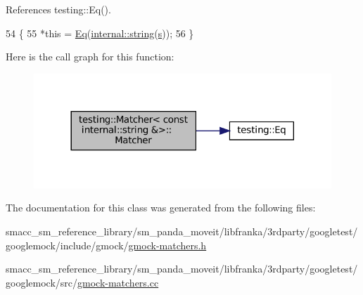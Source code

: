 References testing\+::\+Eq().


\begin{DoxyCode}
54                                                      \{
55   *\textcolor{keyword}{this} = \hyperlink{namespacetesting_a0cb8ba7eae844c871eccb29e7c81635f}{Eq}(\hyperlink{namespacetesting_1_1internal_a8e8ff5b11e64078831112677156cb111}{internal::string}(\hyperlink{namespaceservice__node__3_aa976421a49e0b54f23833423400849ae}{s}));
56 \}
\end{DoxyCode}
Here is the call graph for this function\+:
\nopagebreak
\begin{figure}[H]
\begin{center}
\leavevmode
\includegraphics[width=317pt]{classtesting_1_1Matcher_3_01const_01internal_1_1string_01_6_4_accc8b69db530a019efa2a1d6436eb3db_cgraph}
\end{center}
\end{figure}


The documentation for this class was generated from the following files\+:\begin{DoxyCompactItemize}
\item 
smacc\+\_\+sm\+\_\+reference\+\_\+library/sm\+\_\+panda\+\_\+moveit/libfranka/3rdparty/googletest/googlemock/include/gmock/\hyperlink{gmock-matchers_8h}{gmock-\/matchers.\+h}\item 
smacc\+\_\+sm\+\_\+reference\+\_\+library/sm\+\_\+panda\+\_\+moveit/libfranka/3rdparty/googletest/googlemock/src/\hyperlink{gmock-matchers_8cc}{gmock-\/matchers.\+cc}\end{DoxyCompactItemize}
